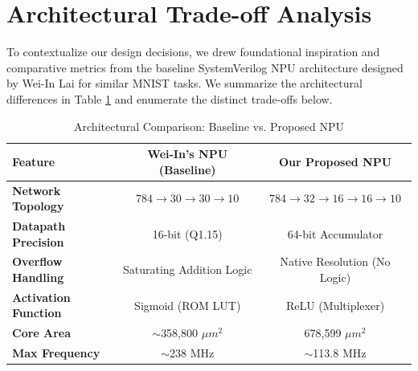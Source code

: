 \section{Architectural Trade-off Analysis}
\label{sec:comparison}

To contextualize our design decisions, we drew foundational inspiration and comparative metrics from the baseline SystemVerilog NPU architecture designed by Wei-In Lai \cite{weinnpu} for similar MNIST tasks. We summarize the architectural differences in Table \ref{tab:arch_comparison} and enumerate the distinct trade-offs below.

\begin{table}[ht]
\centering
\caption{Architectural Comparison: Baseline vs. Proposed NPU}
\label{tab:arch_comparison}
\begin{tabular}{|l|c|c|}
\hline
\textbf{Feature} & \textbf{Wei-In's NPU (Baseline)} & \textbf{Our Proposed NPU} \\ \hline
\textbf{Network Topology} & $784 \to 30 \to 30 \to 10$ & $784 \to 32 \to 16 \to 16 \to 10$ \\ \hline
\textbf{Datapath Precision} & 16-bit (Q1.15) & 64-bit Accumulator \\ \hline
\textbf{Overflow Handling} & Saturating Addition Logic & Native Resolution (No Logic) \\ \hline
\textbf{Activation Function} & Sigmoid (ROM LUT) & ReLU (Multiplexer) \\ \hline
\textbf{Core Area} & $\sim$358,800 $\mu m^2$ & 678,599 $\mu m^2$ \\ \hline
\textbf{Max Frequency} & $\sim$238 MHz & $\sim$113.8 MHz \\ \hline
\end{tabular}
\end{table}

